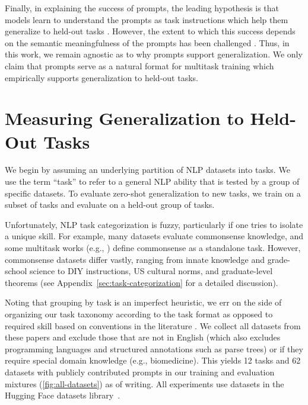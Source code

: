 Finally, in explaining the success of prompts, the leading hypothesis is that models learn to understand the prompts as task instructions which help them generalize to held-out tasks \citep{flan,natural-inst,schick-schutze-2021-exploiting,gpt3}. However, the extent to which this success depends on the semantic meaningfulness of the prompts has been challenged \citep{webson-pavlick-2021, logan2021cutting}. Thus, in this work, we remain agnostic as to why prompts support generalization. We only claim that prompts serve as a natural format for multitask training which empirically supports generalization to held-out tasks.

\section{Measuring Generalization to Held-Out Tasks} 
\label{sec:dataset}

We begin by assuming an underlying partition of NLP datasets into tasks. We use the term ``task'' to refer to a general NLP ability that is tested by a group of specific datasets. To evaluate zero-shot generalization to new tasks, we train on a subset of tasks and evaluate on a held-out group of tasks.

Unfortunately, NLP task categorization is fuzzy, particularly if one tries to isolate a unique skill. For example, many datasets evaluate commonsense knowledge, and some multitask works (e.g., \citealp{gpt3,flan}) define commonsense as a standalone task. However, commonsense datasets differ vastly, ranging from innate knowledge and grade-school science to DIY instructions, US cultural norms, and graduate-level theorems (see Appendix~\ref{sec:task-categorization} for a detailed discussion). 

Noting that grouping by task is an imperfect heuristic, we err on the side of organizing our task taxonomy according to the task format as opposed to required skill based on conventions in the literature \citep{khashabi-etal-2020-unifiedqa,vu-etal-2020-exploring,ye2021crossfit}. We collect all datasets from these papers and exclude those that are not in English (which also excludes programming languages and structured annotations such as parse trees) or if they require special domain knowledge (e.g., biomedicine). This yields 12 tasks and 62 datasets with publicly contributed prompts in our training and evaluation mixtures (\autoref{fig:all-datasets}) as of writing. All experiments use datasets in the Hugging Face datasets library~\citep{lhoest2021datasets}.

